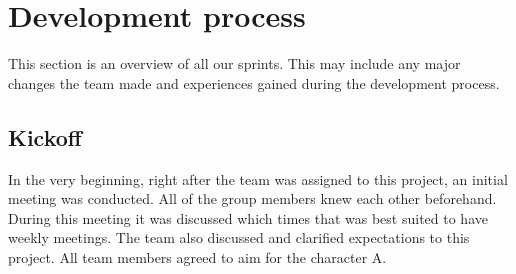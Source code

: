 \chapter{Development process}
\label{sec:sprintOverview}
This section is an overview of all our sprints. This may include any major changes the team made and experiences gained during the development process. 

\section{Kickoff}
In the very beginning, right after the team was assigned to this project, an initial meeting was conducted. All of the group members knew each other beforehand. During this meeting it was discussed which times that was best suited to have weekly meetings. The team also discussed and clarified expectations to this project. All team members agreed to aim for the character A.









